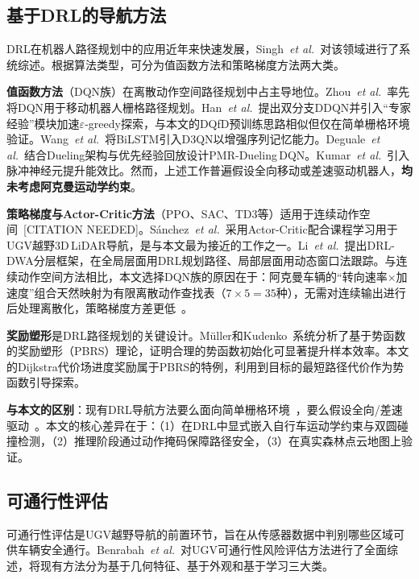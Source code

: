 \documentclass[twocolumn]{elsarticle}
\newcommand{\etal}{\textit{et al.}}
\begin{document}
\subsection{基于DRL的导航方法}

DRL在机器人路径规划中的应用近年来快速发展，Singh~\etal~\cite{singh2023review}对该领域进行了系统综述。根据算法类型，可分为值函数方法和策略梯度方法两大类。

\textbf{值函数方法}（DQN族）在离散动作空间路径规划中占主导地位。Zhou~\etal~\cite{zhou2018dqn}率先将DQN用于移动机器人栅格路径规划。Han~\etal~\cite{han2023improved}提出双分支DDQN并引入``专家经验''模块加速$\varepsilon$-greedy探索，与本文的DQfD预训练思路相似但仅在简单栅格环境验证。Wang~\etal~\cite{wang2025bilstm}将BiLSTM引入D3QN以增强序列记忆能力。Deguale~\etal~\cite{deguale2024pmr}结合Dueling架构与优先经验回放设计PMR-Dueling\,DQN。Kumar~\etal~\cite{kumar2025dsqn}引入脉冲神经元提升能效比。然而，上述工作普遍假设全向移动或差速驱动机器人，\textbf{均未考虑阿克曼运动学约束}。

\textbf{策略梯度与Actor-Critic方法}（PPO、SAC、TD3等）适用于连续动作空间~[CITATION NEEDED]。S\'{a}nchez~\etal~\cite{sanchez2023rl}采用Actor-Critic配合课程学习用于UGV越野3D\,LiDAR导航，是与本文最为接近的工作之一。Li~\etal~\cite{li2025ugvdwa}提出DRL-DWA分层框架，在全局层面用DRL规划路径、局部层面用动态窗口法跟踪。与连续动作空间方法相比，本文选择DQN族的原因在于：阿克曼车辆的``转向速率$\times$加速度''组合天然映射为有限离散动作查找表（$7\times5=35$种），无需对连续输出进行后处理离散化，策略梯度方差更低~\cite{sichkar2019reinforcement}。

\textbf{奖励塑形}是DRL路径规划的关键设计。M\"{u}ller和Kudenko~\cite{mueller2025pbrs}系统分析了基于势函数的奖励塑形（PBRS）理论，证明合理的势函数初始化可显著提升样本效率。本文的Dijkstra代价场进度奖励属于PBRS的特例，利用到目标的最短路径代价作为势函数引导探索。

\textbf{与本文的区别}：现有DRL导航方法要么面向简单栅格环境~\cite{zhou2018dqn,kumar2025dsqn,deguale2024pmr}，要么假设全向/差速驱动~\cite{wang2025bilstm,han2023improved}。本文的核心差异在于：（1）在DRL中显式嵌入自行车运动学约束与双圆碰撞检测，（2）推理阶段通过动作掩码保障路径安全，（3）在真实森林点云地图上验证。

\subsection{可通行性评估}

可通行性评估是UGV越野导航的前置环节，旨在从传感器数据中判别哪些区域可供车辆安全通行。Benrabah~\etal~\cite{benrabah2024traversability}对UGV可通行性风险评估方法进行了全面综述，将现有方法分为基于几何特征、基于外观和基于学习三大类。
\end{document}
